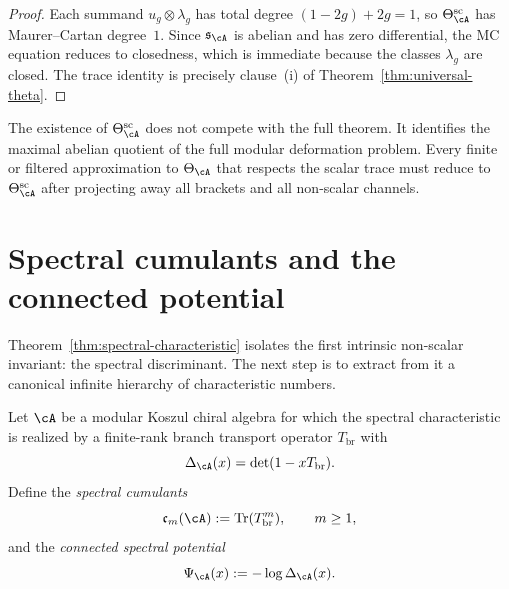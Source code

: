 \begin{proof}
Each summand
\(u_g\otimes \lambda_g\) has total degree
\((1-2g)+2g=1\), so
\(\Theta^{\mathrm{sc}}_{\cA}\) has Maurer--Cartan degree~\(1\).
Since \(\mathfrak{s}_{\cA}\) is abelian and has zero differential, the
MC equation reduces to closedness, which is immediate because the
classes \(\lambda_g\) are closed. The trace identity is precisely
clause~\textup{(i)} of Theorem~\ref{thm:universal-theta}.
\end{proof}

\begin{remark}
\label{rem:scalar-skeleton-not-replacement}
The existence of \(\Theta^{\mathrm{sc}}_{\cA}\) does not compete with the
full theorem. It identifies the maximal abelian quotient of the full
modular deformation problem. Every finite or filtered approximation to
\(\Theta_{\cA}\) that respects the scalar trace must reduce to
\(\Theta^{\mathrm{sc}}_{\cA}\) after projecting away all brackets and all
non-scalar channels.
\end{remark}

\section{Spectral cumulants and the connected potential}
\label{sec:blr-spectral-cumulants}

Theorem~\ref{thm:spectral-characteristic} isolates the first intrinsic
non-scalar invariant: the spectral discriminant. The next step is to
extract from it a canonical infinite hierarchy of characteristic
numbers.

\begin{definition}
\label{def:spectral-cumulants}
Let \(\cA\) be a modular Koszul chiral algebra for which the spectral
characteristic is realized by a finite-rank branch transport operator
\(T_{\mathrm{br}}\) with
\[
\Delta_{\cA}(x)=\det(1-xT_{\mathrm{br}}).
\]
Define the \emph{spectral cumulants}
\[
\mathfrak c_m(\cA):=\operatorname{Tr}(T_{\mathrm{br}}^m),
\qquad m\geq 1,
\]
and the \emph{connected spectral potential}
\begin{equation}
\label{eq:connected-spectral-potential}
\Psi_{\cA}(x):=-\log \Delta_{\cA}(x).
\end{equation}
\end{definition}

